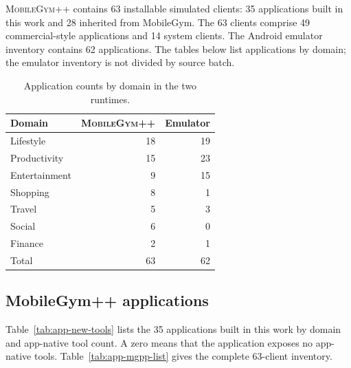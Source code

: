 \textsc{MobileGym++} contains 63 installable simulated clients: 35 applications built in this work and 28 inherited from MobileGym. The 63 clients comprise 49 commercial-style applications and 14 system clients. The Android emulator inventory contains 62 applications. The tables below list applications by domain; the emulator inventory is not divided by source batch.

\begin{table}[H]
\centering
\small
\caption{Application counts by domain in the two runtimes.}
\label{tab:app-domain-counts}
\begin{tabular}{lrr}
\toprule
Domain & \textsc{MobileGym++} & Emulator \\
\midrule
Lifestyle & 18 & 19 \\
Productivity & 15 & 23 \\
Entertainment & 9 & 15 \\
Shopping & 8 & 1 \\
Travel & 5 & 3 \\
Social & 6 & 0 \\
Finance & 2 & 1 \\
\midrule
Total & 63 & 62 \\
\bottomrule
\end{tabular}
\end{table}

\subsection{MobileGym++ applications}
\label{app:mgpp-app-table}

Table~\ref{tab:app-new-tools} lists the 35 applications built in this work by domain and app-native tool count. A zero means that the application exposes no app-native tools. Table~\ref{tab:app-mgpp-list} gives the complete 63-client inventory.

